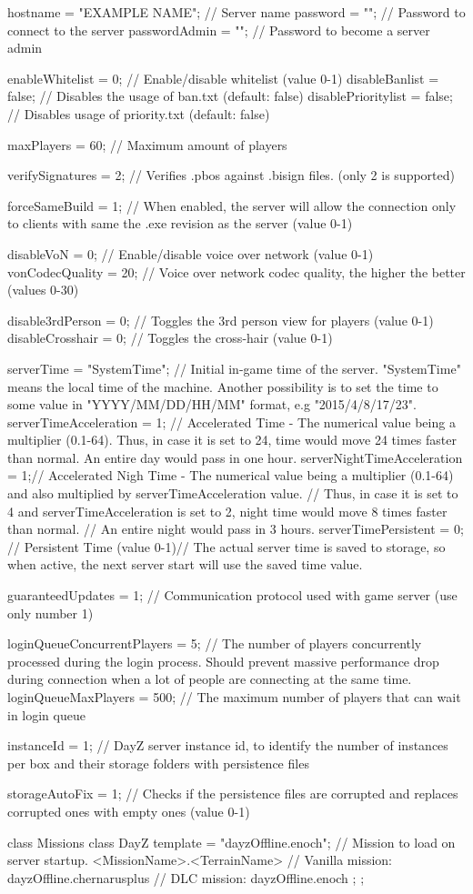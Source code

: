 hostname = "EXAMPLE NAME";	// Server name
password = "";				// Password to connect to the server
passwordAdmin = "";			// Password to become a server admin

enableWhitelist = 0;		// Enable/disable whitelist (value 0-1)
disableBanlist = false;					// Disables the usage of ban.txt (default: false)
disablePrioritylist = false;			// Disables usage of priority.txt (default: false)

maxPlayers = 60;			// Maximum amount of players

verifySignatures = 2;		// Verifies .pbos against .bisign files. (only 2 is supported)

forceSameBuild = 1;			// When enabled, the server will allow the connection only to clients with same the .exe revision as the server (value 0-1)

disableVoN = 0;				// Enable/disable voice over network (value 0-1)
vonCodecQuality = 20;		// Voice over network codec quality, the higher the better (values 0-30)

disable3rdPerson = 0;		// Toggles the 3rd person view for players (value 0-1)
disableCrosshair = 0;		// Toggles the cross-hair (value 0-1)

serverTime = "SystemTime";	// Initial in-game time of the server. "SystemTime" means the local time of the machine. Another possibility is to set the time to some value in "YYYY/MM/DD/HH/MM" format, e.g "2015/4/8/17/23".
serverTimeAcceleration = 1;	// Accelerated Time - The numerical value being a multiplier (0.1-64). Thus, in case it is set to 24, time would move 24 times faster than normal. An entire day would pass in one hour.
serverNightTimeAcceleration = 1;// Accelerated Nigh Time - The numerical value being a multiplier (0.1-64) and also multiplied by serverTimeAcceleration value.
								// Thus, in case it is set to 4 and serverTimeAcceleration is set to 2, night time would move 8 times faster than normal.
								// An entire night would pass in 3 hours.
serverTimePersistent = 0;	// Persistent Time (value 0-1)// The actual server time is saved to storage, so when active, the next server start will use the saved time value.

guaranteedUpdates = 1;		// Communication protocol used with game server (use only number 1)

loginQueueConcurrentPlayers = 5;	// The number of players concurrently processed during the login process. Should prevent massive performance drop during connection when a lot of people are connecting at the same time.
loginQueueMaxPlayers = 500;			// The maximum number of players that can wait in login queue

instanceId = 1;				// DayZ server instance id, to identify the number of instances per box and their storage folders with persistence files

storageAutoFix = 1;			// Checks if the persistence files are corrupted and replaces corrupted ones with empty ones (value 0-1)


class Missions
{
	class DayZ
	{
		template = "dayzOffline.enoch"; // Mission to load on server startup. <MissionName>.<TerrainName>
		                                        // Vanilla mission: dayzOffline.chernarusplus
					                            // DLC mission: dayzOffline.enoch
	};
};